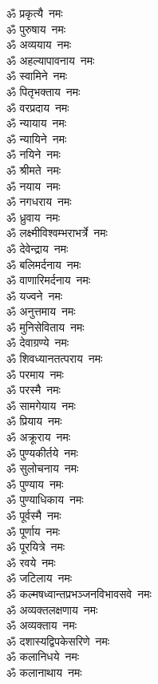 \begin{multicols}{2}
\begin{flushleft}
ॐ प्रकृत्यै~नमः\\
ॐ पुरुषाय~नमः\\
ॐ अव्ययाय~नमः\\
ॐ अहल्यापावनाय~नमः\\
ॐ स्वामिने~नमः\hfill{}\\
ॐ पितृभक्ताय~नमः\\
ॐ वरप्रदाय~नमः\\
ॐ न्यायाय~नमः\\
ॐ न्यायिने~नमः\\
ॐ नयिने~नमः\\
ॐ श्रीमते~नमः\\
ॐ नयाय~नमः\\
ॐ नगधराय~नमः\\
ॐ ध्रुवाय~नमः\\
ॐ लक्ष्मीविश्वम्भराभर्त्रे~नमः\hfill{}\\
ॐ देवेन्द्राय~नमः\\
ॐ बलिमर्दनाय~नमः\\
ॐ वाणारिमर्दनाय~नमः\\
ॐ यज्वने~नमः\\
ॐ अनुत्तमाय~नमः\\
ॐ मुनिसेविताय~नमः\\
ॐ देवाग्रण्ये~नमः\\
ॐ शिवध्यानतत्पराय~नमः\\
ॐ परमाय~नमः\\
ॐ परस्मै~नमः\hfill{}\\
ॐ सामगेयाय~नमः\\
ॐ प्रियाय~नमः\\
ॐ अक्रूराय~नमः\\
ॐ पुण्यकीर्तये~नमः\\
ॐ सुलोचनाय~नमः\\
ॐ पुण्याय~नमः\\
ॐ पुण्याधिकाय~नमः\\
ॐ पूर्वस्मै~नमः\\
ॐ पूर्णाय~नमः\\
ॐ पूरयित्रे~नमः\hfill{}\\
ॐ रवये~नमः\\
ॐ जटिलाय~नमः\\
ॐ कल्मषध्वान्तप्रभञ्जन\-विभावसवे~नमः\\
ॐ अव्यक्तलक्षणाय~नमः\\
ॐ अव्यक्ताय~नमः\\
ॐ दशास्यद्विपकेसरिणे~नमः\\
ॐ कलानिधये~नमः\\
ॐ कलानाथाय~नमः\\

\end{flushleft}
\end{multicols}

